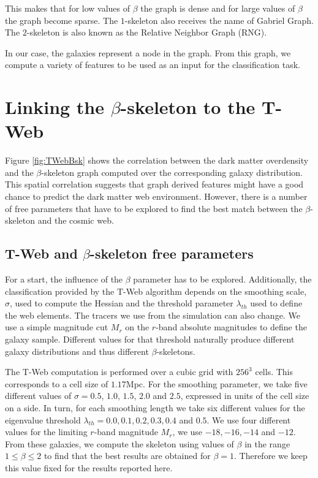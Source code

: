 \documentclass[usenatbib]{mnras}
\begin{document}
This makes that for low values of $\beta$ the graph is dense and for
large values of $\beta$ the graph become sparse. 
The $1$-skeleton also receives the name of Gabriel Graph.  
The $2$-skeleton is also known as the Relative Neighbor Graph (RNG).

In our case, the galaxies represent a node in the graph.
From this graph, we compute a variety of features to be used as an input for the classification task.

\section{Linking the $\beta$-skeleton to the T-Web}\label{sec:link}

Figure \ref{fig:TWebBsk} shows the correlation between the dark matter overdensity
and the $\beta$-skeleton graph computed over the corresponding galaxy
distribution. 
This spatial correlation suggests that graph derived features might have
a good chance to predict the dark matter web environment. 
However, there is a number of free parameters that have to be explored
to find the best match between the $\beta$-skeleton and the cosmic web.

\subsection{T-Web and $\beta$-skeleton free parameters}

For a start, the influence of the $\beta$ parameter has to be explored.
Additionally, the classification provided by the T-Web algorithm
depends on the smoothing scale, $\sigma$, used to compute the Hessian and the
threshold parameter $\lambda_{th}$ used to define the web elements.
The tracers we use from the simulation can also change. 
We use a simple magnitude cut $M_{r}$ on the $r$-band absolute magnitudes
to define the galaxy sample. 
Different values for that threshold naturally produce different galaxy
distributions and thus different $\beta$-skeletons. 

The T-Web computation is performed over a cubic grid with $256^3$
cells. 
This corresponds to a cell size of $1.17$Mpc.
For the smoothing parameter, we take five different values of $\sigma =
0.5$, $1.0$, $1.5$, $2.0$ and $2.5$, expressed in units of the cell size on a side.
In turn, for each smoothing length we take six different values for
the eigenvalue threshold
$\lambda_{th}=0.0, 0.1, 0.2, 0.3, 0.4$ and $0.5$. 
We use four different values for the limiting $r$-band magnitude
$M_{r}$, we use  $-18, -16, -14$ and $-12$.
From these galaxies, we compute the skeleton using values of $\beta$ in
the range $1\leq \beta \leq 2$ to find that the best results are
obtained for $\beta=1$.
Therefore we keep this value fixed for the results reported here.
\end{document}
